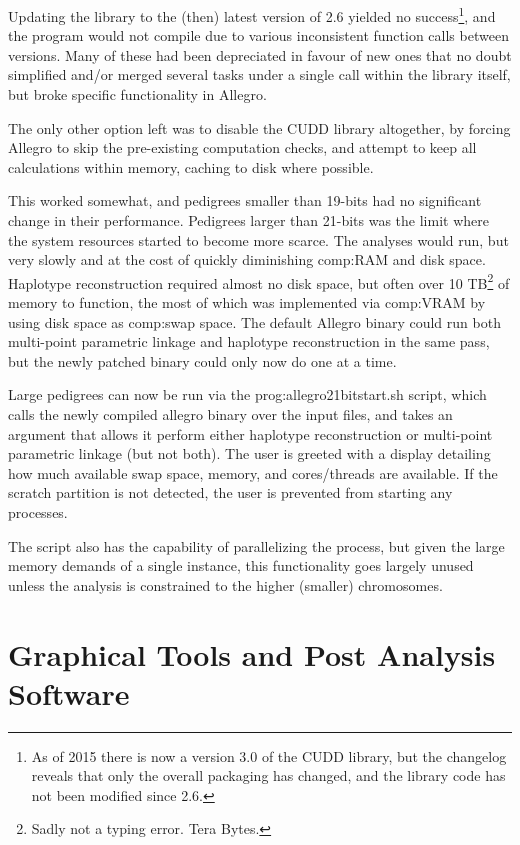 Updating the library to the (then) latest version of 2.6 yielded no success\footnote{As of 2015 there is now a version 3.0 of the CUDD library, but the changelog reveals that only the overall packaging has changed, and the library code has not been modified since 2.6.}, and the program would not compile due to various inconsistent function calls between versions. Many of these had been depreciated in favour of new ones that no doubt simplified and/or merged several tasks under a single call within the library itself, but broke specific functionality in Allegro.

The only other option left was to disable the CUDD library altogether, by forcing Allegro to skip the pre-existing computation checks, and attempt to keep all calculations within memory, caching to disk where possible.

This worked somewhat, and pedigrees smaller than 19-bits had no significant change in their performance. Pedigrees larger than 21-bits was the limit where the system resources started to become more scarce. The analyses would run, but very slowly and at the cost of quickly diminishing \gls{comp:RAM} and disk space. Haplotype reconstruction required almost no disk space, but often over 10 TB\footnote{Sadly not a typing error. Tera Bytes.} of memory to function, the most of which was implemented via \gls{comp:VRAM} by using disk space as \gls{comp:swap space}. The default Allegro binary could run both multi-point parametric linkage and haplotype reconstruction in the same pass, but the newly patched binary could only now do one at a time.

Large pedigrees can now be run via the \gls{prog:allegro21bitstart.sh} script, which calls the newly compiled allegro binary over the input files, and takes an argument that allows it perform either haplotype reconstruction or multi-point parametric linkage (but not both). The user is greeted with a display detailing how much available swap space, memory, and cores/threads are available. If the scratch partition is not detected, the user is prevented from starting any processes.

The script also has the capability of parallelizing the process, but given the large memory demands of a single instance, this functionality goes largely unused unless the analysis is constrained to the higher (smaller) chromosomes.


\section{Graphical Tools and Post Analysis Software}

